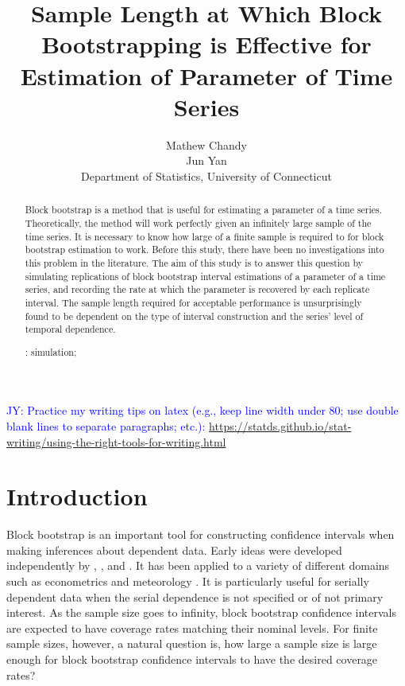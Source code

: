 \documentclass[12pt, letterpaper, titlepage]{article}
\title{Sample Length at Which Block Bootstrapping is Effective for Estimation of Parameter of Time Series}
\author{Mathew Chandy\\
  Jun Yan\\[1ex]
  Department of Statistics, University of Connecticut\\
}
\date{}
\newcommand{\jy}[1]{\textcolor{blue}{JY: #1}}
\begin{document}
 
\maketitle

\doublespace

\begin{abstract}
Block bootstrap is a method that is useful for estimating a parameter of a time
series. Theoretically, the method will work perfectly given an infinitely large sample of the time series.
It is necessary to know how large of a finite sample is required to for block bootstrap estimation to work. Before this study, there have been no investigations into this problem in the literature. The aim of this study is to answer this question by simulating replications of block bootstrap interval estimations of a parameter of a time series, and recording the rate at which the parameter is recovered by each replicate interval. The sample length required for acceptable performance is unsurprisingly found to be dependent on the type of interval construction and the series' level of temporal dependence.


\bigskip
\noindent{}:
simulation;
\end{abstract}


\jy{Practice my writing tips on latex (e.g., keep line width under 80; use
  double blank lines to separate paragraphs; etc.):
\url{https://statds.github.io/stat-writing/using-the-right-tools-for-writing.html}}

\section{Introduction}
\label{sec:intro}

Block bootstrap is an important tool for constructing confidence intervals when
making inferences about dependent data. Early ideas were developed independently
by \citet{hall1985resampling}, \citet{carlstein1986use}, and 
\citet{kunsch1989jackknife}. %
It has been applied to a variety of different domains such 
as econometrics \citep{mackinnon2006bootstrap} and meteorology
\citep{varga2017generalised}. It is particularly useful for serially dependent
data when the serial dependence is not specified or of not primary interest.
As the sample size goes to infinity, block bootstrap confidence intervals are
expected to have coverage rates matching their nominal levels. For finite sample
sizes, however, a natural question is, how large a sample size is large enough
for block bootstrap confidence intervals to have the desired coverage rates?
\end{document}
